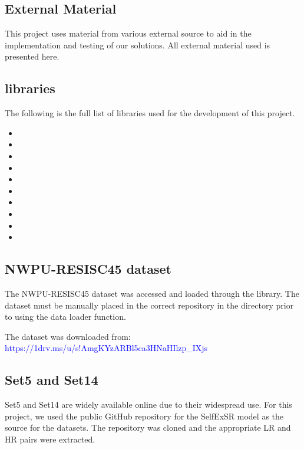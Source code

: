 \begin{appendices}
\chapter{External Material}\label{app:external_material}
This project uses material from various external source to aid in the implementation and testing of our solutions. All external material used is presented here.

\section{ libraries}
The following is the full list of  libraries used for the development of this project.
\begin{itemize}
    \item {}
    \item {}
    \item {}
    \item {}
    \item {}
    \item {}
    \item {}
    \item {}
    \item {}
    \item {}
\end{itemize}

\section{NWPU-RESISC45 dataset}
The NWPU-RESISC45 dataset was accessed and loaded through the  library. The dataset must be manually placed in the correct repository in the  directory prior to using the data loader function. 

The dataset was downloaded from: \textcolor{blue}{https://1drv.ms/u/s!AmgKYzARBl5ca3HNaHIlzp\_IXjs}

\section{Set5 and Set14}
Set5 and Set14 are widely available online due to their widespread use. For this project, we used the public GitHub repository for the SelfExSR model as the source for the datasets. The repository was cloned and the appropriate LR and HR pairs were extracted.


\end{appendices}

